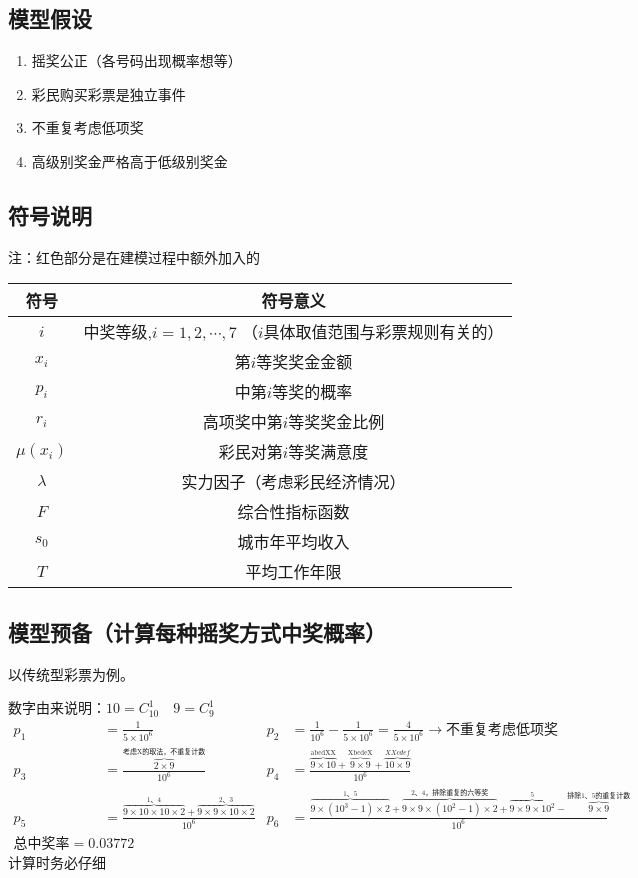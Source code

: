 \subsection{模型假设}
	\begin{enumerate}
		\item 摇奖公正（各号码出现概率想等）
		\item 彩民购买彩票是独立事件
		\item 不重复考虑低项奖
		\item 高级别奖金严格高于低级别奖金
	\end{enumerate}

\subsection{符号说明}
注：红色部分是在建模过程中额外加入的
	
	\begin{tabular}{cc}
		\toprule
		符号 & 符号意义 \\
		\midrule
		$i$ & 中奖等级,$i = 1, 2, \cdots, 7$ （$i$具体取值范围与彩票规则有关的） \\
		$x_i$ & 第$i$等奖奖金金额 \\
		$p_i$ & 中第$i$等奖的概率 \\
		$r_i$ & 高项奖中第$i$等奖奖金比例 \\
		\color{red}
		$\mu(x_i)$ & 彩民对第$i$等奖满意度 \\
		\color{red}
		$\lambda$ & 实力因子（考虑彩民经济情况） \\
		\color{red}
		$F$ & 综合性指标函数 \\
		\color{red}
		$s_0$ & 城市年平均收入 \\
		\color{red}
		$T$ & 平均工作年限 \\
		\bottomrule
	\end{tabular}
    
\subsection{模型预备（计算每种摇奖方式中奖概率）}
	以传统型彩票为例。
	
	数字由来说明：$10 = C_10^1\quad 9 = C_9^1$
	\begin{align*}
	p_1 &= \frac{1}{5\times10^6} & p_2 &= \frac{1}{10^6} - \frac{1}{5\times10^6} = \frac{4}{5\times10^6} \longrightarrow \text{不重复考虑低项奖}\\
	p_3 &= \frac{\overbrace{2\times9}^{\text{考虑X的取法，不重复计数}}}{10^6} & p_4 &= \frac{\overbrace{9\times10}^{\text{abcdXX}} + \overbrace{9\times9}^{\text{XbcdeX}} + \overbrace{10\times9}^{XXcdef}}{10^6}\\
	p_5 &= \frac{\overbrace{9\times10\times10\times2}^{\text{1、4}} + \overbrace{9\times9\times10\times2}^{\text{2、3}}}{10^6} & p_6 &= \frac{\overbrace{9\times(10^3-1)\times2}^{\text{1、5}} + \overbrace{9\times9\times(10^2-1)\times2}^{\text{2、4，排除重复的六等奖}} + \overbrace{9\times9\times10^2}^{5} - \overbrace{9\times9}^{\text{排除1、5的重复计数}}}{10^6}\\
	\text{总中奖率} = 0.03772
	\end{align*}
	计算时务必仔细

